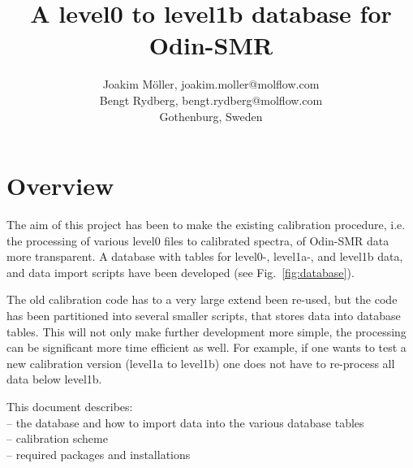 \documentclass[12pt]{article}
\begin{document}
\fancyhead[CE,CO]{}
\fancyhead[RE,RO]{\bfseries\nouppercase\leftmark}
\fancyfoot[LO,LE]{}
\fancyfoot[RO,RE]{}
\fancyfoot[CO,CE]{}
\renewcommand{\footrulewidth}{0.4pt}
\renewcommand{\headrulewidth}{0.4pt}

\title{A level0 to level1b database for Odin-SMR\\
       \vspace*{85mm}}
\author{Joakim M\"{o}ller, joakim.moller@molflow.com\\
        Bengt Rydberg, bengt.rydberg@molflow.com\\
        Gothenburg, Sweden\\
        }
\maketitle
\thispagestyle{empty}
\newpage
\tableofcontents
\thispagestyle{empty}
\newpage
\setcounter{page}{1}
\section{Overview}
The aim of this project has been to make the existing
calibration procedure, i.e. the processing of various
level0 files to calibrated spectra, of Odin-SMR data 
more transparent.
A database with tables for level0-, level1a-, and level1b data,
and data import scripts have been developed (see Fig.~\ref{fig:database}).

The old calibration code has to a very large extend been re-used,
but the code has been partitioned into several smaller scripts,
that stores data into database tables. This will not only make
further development more simple, the processing can be significant more
time efficient as well. For example, if one wants to test a new
calibration version (level1a to level1b) one does not have to
re-process all data below level1b.       

This document describes: \\
-- the database and how to import 
data into the various database tables\\
-- calibration scheme\\
-- required packages and installations\\
\end{document}
